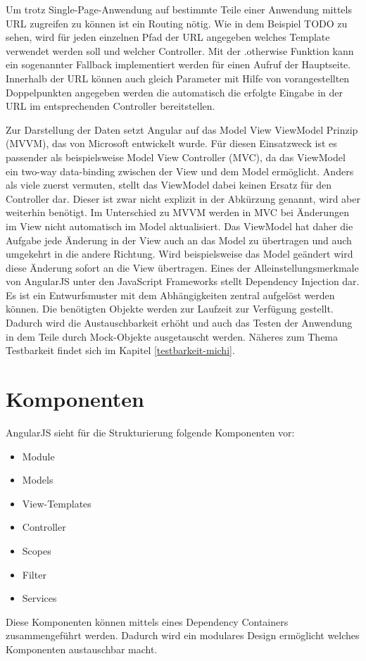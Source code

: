 Um trotz Single-Page-Anwendung auf bestimmte Teile einer Anwendung mittels URL zugreifen zu können ist ein Routing nötig.
Wie in dem Beispiel TODO zu sehen, wird für jeden einzelnen Pfad der URL angegeben welches Template verwendet werden soll und welcher Controller.
Mit der .otherwise Funktion kann ein sogenannter Fallback implementiert werden für einen Aufruf der Hauptseite.
Innerhalb der URL können auch gleich Parameter mit Hilfe von vorangestellten Doppelpunkten angegeben werden die automatisch die erfolgte Eingabe in der URL im entsprechenden Controller bereitstellen.

Zur Darstellung der Daten setzt Angular auf das Model View ViewModel Prinzip (MVVM), das von Microsoft entwickelt wurde.
Für diesen Einsatzweck ist es passender als beispielsweise Model View Controller (MVC), da das ViewModel ein two-way data-binding zwischen der View und dem Model ermöglicht.
Anders als viele zuerst vermuten, stellt das ViewModel dabei keinen Ersatz für den Controller dar.
Dieser ist zwar nicht explizit in der Abkürzung genannt, wird aber weiterhin benötigt.
Im Unterschied zu MVVM werden in MVC bei Änderungen im View nicht automatisch im Model aktualisiert.
Das ViewModel hat daher die Aufgabe jede Änderung in der View auch an das Model zu übertragen und auch umgekehrt in die andere Richtung.
Wird beispielsweise das Model geändert wird diese Änderung sofort an die View übertragen.
Eines der Alleinstellungsmerkmale von AngularJS unter den JavaScript Frameworks stellt Dependency Injection dar.
Es ist ein Entwurfsmuster mit dem Abhängigkeiten zentral aufgelöst werden können.
Die benötigten Objekte werden zur Laufzeit zur Verfügung gestellt.
Dadurch wird die Austauschbarkeit erhöht und auch das Testen der Anwendung in dem Teile durch Mock-Objekte ausgetauscht werden.
Näheres zum Thema Testbarkeit findet sich im Kapitel \ref{testbarkeit-michi}.

\section{Komponenten}
AngularJS sieht für die Strukturierung folgende Komponenten vor:
\begin{itemize}
	\item Module
	\item Models
	\item View-Templates
	\item Controller
	\item Scopes
	\item Filter
	\item Services
\end{itemize}
Diese Komponenten können mittels eines Dependency Containers zusammengeführt werden.
Dadurch wird ein modulares Design ermöglicht welches Komponenten austauschbar macht.

